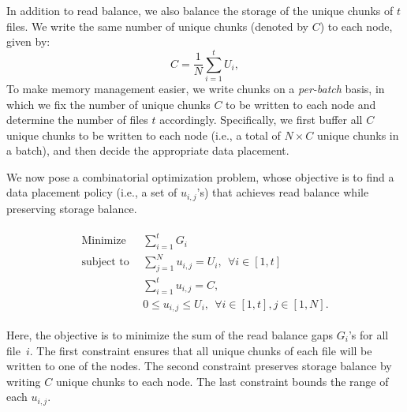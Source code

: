In addition to read balance, we also balance the storage of the unique chunks
of $t$ files.  We write the same number of unique chunks (denoted by $C$) to
each node, given by:
\begin{equation}
C = \frac{1}{N}\sum_{i=1}^{t} U_i, 
\end{equation}
%
To make memory management easier, we write chunks on a {\em per-batch} basis,
in which we fix the number of unique chunks $C$ to be written to each node and
determine the number of files $t$ accordingly.  Specifically, we first buffer
all $C$ unique chunks to be written to each node (i.e., a total of $N\times C$
unique chunks in a batch), and then decide the appropriate data placement.  



We now pose a combinatorial optimization problem, whose objective is to
find a data placement policy (i.e., a set of $u_{i,j}$'s) that achieves read
balance while preserving storage balance.

\begin{problem}
\label{problem:gap}
\begin{align*}
\begin{split}
\textrm{Minimize} \ \ & \sum_{i=1}^{t} G_i \\
\textrm{subject to} \ \ & \sum_{j=1}^{N} u_{i,j} = U_i, 
	\>\>\forall i\in[1,t]\\
& \sum_{i=1}^{t} u_{i,j} = C, \\
& 0\le u_{i,j} \le U_i, \>\>\forall i\in[1,t], j\in[1,N].
\end{split}
\end{align*}
\end{problem}
%
Here, the objective is to minimize the sum of the read balance gaps
$G_i$'s for all file~$i$.  The first constraint ensures that all unique
chunks of each file will be written to one of the nodes.  The second
constraint preserves storage balance by writing $C$ unique chunks to each node.
The last constraint bounds the range of each $u_{i,j}$.  

